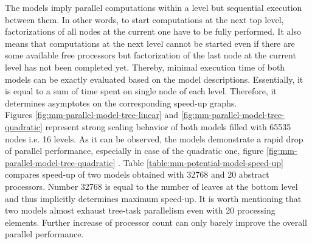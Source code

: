 


The models imply parallel computations within a  level but sequential execution between them. In other words, to start computations at the next top level, factorizations of all nodes at the current  one have to be fully performed. It also means that computations at the next level cannot be started  even if there are some available free processors but factorization of the last node at the current level has not been completed yet. Thereby, minimal execution time  of both models can be exactly evaluated based on the model descriptions. Essentially, it is equal to a sum of time spent on single node of each level. Therefore, it determines asymptotes on the corresponding speed-up graphs.\\



Figures \ref{fig:mm-parallel-model-tree-linear} and \ref{fig:mm-parallel-model-tree-quadratic} represent strong scaling behavior of both models filled with 65535 nodes i.e. 16 levels. As it can be observed, the models demonstrate a rapid drop of parallel performance, especially in case of the quadratic one, figure \ref{fig:mm-parallel-model-tree-quadratic} . Table \ref{table:mm-potential-model-speed-up} compares speed-up of two models obtained with 32768 and 20 abstract processors. Number 32768 is equal to the number of leaves at the bottom level and thus implicitly determines maximum speed-up. It is worth mentioning that two models almost exhaust tree-task parallelism even with 20 processing elements. Further increase of processor count can only barely improve the overall parallel performance.\\


